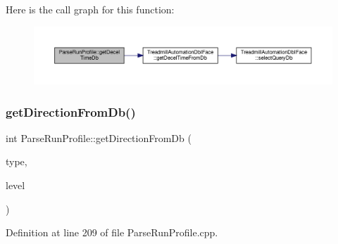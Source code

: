Here is the call graph for this function\+:
\nopagebreak
\begin{figure}[H]
\begin{center}
\leavevmode
\includegraphics[width=350pt]{class_parse_run_profile_a02fea0744103223c7b7462a5a2054c52_cgraph}
\end{center}
\end{figure}
\mbox{\label{class_parse_run_profile_a314fabde62110ee4da32de14e5b5c607}} 
\subsubsection{\texorpdfstring{get\+Direction\+From\+Db()}{getDirectionFromDb()}}
{\footnotesize\ttfamily int Parse\+Run\+Profile\+::get\+Direction\+From\+Db (\begin{DoxyParamCaption}\item[{Q\+String}]{type,  }\item[{Q\+String}]{level }\end{DoxyParamCaption})}



Definition at line 209 of file Parse\+Run\+Profile.\+cpp.

